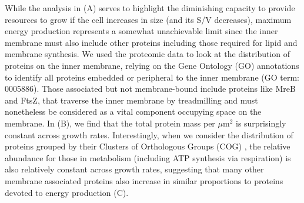 While the analysis in  (A) serves to highlight the
diminishing capacity to provide resources to grow if the cell increases in size
(and its S/V decreases), maximum energy production represents a somewhat
unachievable limit since the inner membrane must also include other proteins
including those required for lipid and membrane synthesis. We used the proteomic
data to look at the distribution of proteins on the inner membrane, relying on
the Gene Ontology (GO) annotations
\citep{ashburner2000,thegeneOntologyconsortium2018} to identify all proteins
embedded or peripheral to the inner membrane (GO term: 0005886). Those
associated but not membrane-bound include proteins like MreB and FtsZ, that
traverse the inner membrane by treadmilling and must nonetheless be considered
as a vital component occupying space on the membrane. In 
(B), we find that the total protein mass per $\mu$m$^2$ is surprisingly constant
across growth rates. Interestingly, when we consider the distribution of
proteins grouped by their Clusters of Orthologous Groups (COG)
\citep{tatusov2000}, the relative abundance for those in metabolism (including
ATP synthesis via respiration) is also relatively constant across growth rates,
suggesting that many other membrane associated proteins also increase in similar
proportions to proteins devoted to energy production  (C).


